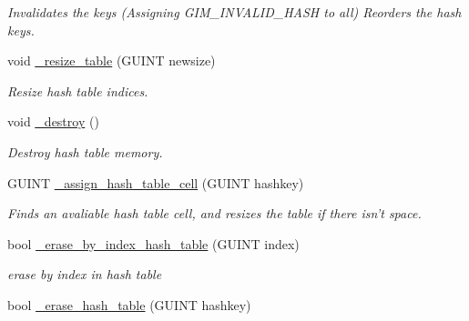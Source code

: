 \begin{CompactItemize}
\begin{CompactList}\small\item\em Invalidates the keys (Assigning GIM\_\-INVALID\_\-HASH to all) Reorders the hash keys. \item\end{CompactList}\item 
\hypertarget{classgim__hash__table_51905040dee4c41954f5de1634c090dd}{
void \hyperlink{classgim__hash__table_51905040dee4c41954f5de1634c090dd}{\_\-resize\_\-table} (GUINT newsize)}
\label{classgim__hash__table_51905040dee4c41954f5de1634c090dd}

\begin{CompactList}\small\item\em Resize hash table indices. \item\end{CompactList}\item 
\hypertarget{classgim__hash__table_2b7a2b3eb817edf8af93a85ce910a5ca}{
void \hyperlink{classgim__hash__table_2b7a2b3eb817edf8af93a85ce910a5ca}{\_\-destroy} ()}
\label{classgim__hash__table_2b7a2b3eb817edf8af93a85ce910a5ca}

\begin{CompactList}\small\item\em Destroy hash table memory. \item\end{CompactList}\item 
\hypertarget{classgim__hash__table_93e5bf5c573a39e21e9bd0a4aec38e1a}{
GUINT \hyperlink{classgim__hash__table_93e5bf5c573a39e21e9bd0a4aec38e1a}{\_\-assign\_\-hash\_\-table\_\-cell} (GUINT hashkey)}
\label{classgim__hash__table_93e5bf5c573a39e21e9bd0a4aec38e1a}

\begin{CompactList}\small\item\em Finds an avaliable hash table cell, and resizes the table if there isn't space. \item\end{CompactList}\item 
\hypertarget{classgim__hash__table_fbaacd523281706f94476ae60917856e}{
bool \hyperlink{classgim__hash__table_fbaacd523281706f94476ae60917856e}{\_\-erase\_\-by\_\-index\_\-hash\_\-table} (GUINT index)}
\label{classgim__hash__table_fbaacd523281706f94476ae60917856e}

\begin{CompactList}\small\item\em erase by index in hash table \item\end{CompactList}\item 
\hypertarget{classgim__hash__table_f03ef67dcf7b0e805e34df6a5de4425f}{
bool \hyperlink{classgim__hash__table_f03ef67dcf7b0e805e34df6a5de4425f}{\_\-erase\_\-hash\_\-table} (GUINT hashkey)}
\label{classgim__hash__table_f03ef67dcf7b0e805e34df6a5de4425f}


\end{CompactItemize}

